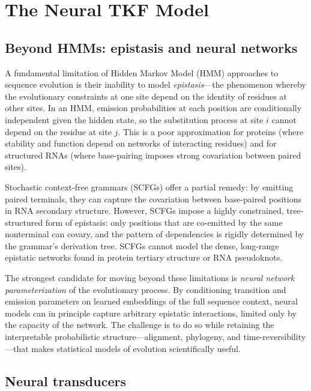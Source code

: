 
\section{The Neural TKF Model}
\label{sec:neural-tkf}

\subsection{Beyond HMMs: epistasis and neural networks}

A fundamental limitation of Hidden Markov Model (HMM) approaches to sequence evolution
is their inability to model \emph{epistasis}---the phenomenon whereby
the evolutionary constraints at one site depend on the identity of residues at other sites.
In an HMM, emission probabilities at each position are conditionally independent
given the hidden state, so the substitution process at site $i$
cannot depend on the residue at site $j$.
This is a poor approximation for proteins (where stability and function
depend on networks of interacting residues)
and for structured RNAs (where base-pairing imposes strong covariation between paired sites).

Stochastic context-free grammars (SCFGs) offer a partial remedy:
by emitting paired terminals, they can capture the covariation
between base-paired positions in RNA secondary structure.
However, SCFGs impose a highly constrained, tree-structured form of epistasis:
only positions that are co-emitted by the same nonterminal can covary,
and the pattern of dependencies is rigidly determined by the grammar's derivation tree.
SCFGs cannot model the dense, long-range epistatic networks
found in protein tertiary structure or RNA pseudoknots.

The strongest candidate for moving beyond these limitations
is \emph{neural network parameterization} of the evolutionary process.
By conditioning transition and emission parameters on learned embeddings
of the full sequence context, neural models can in principle capture
arbitrary epistatic interactions, limited only by the capacity of the network.
The challenge is to do so while retaining the interpretable probabilistic structure---alignment,
phylogeny, and time-reversibility---that makes statistical models of evolution scientifically useful.

\subsection{Neural transducers}

